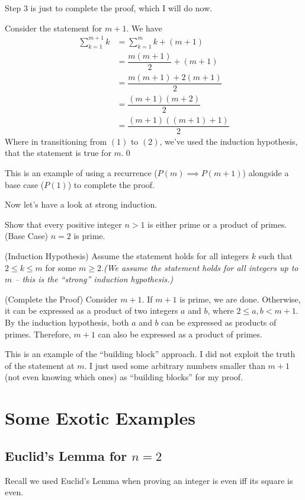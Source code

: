Step $3$ is just to complete the proof, which I will do now.
\begin{smrg}
Consider the statement for $m + 1$. We have
\begin{align}
\sum\limits_{k=1}^{m+1} k &= \sum\limits_{k=1}^{m} k + (m + 1) \\
&= \dfrac {m(m+1)}2 + (m + 1)\\
&= \dfrac {m(m+1) + 2(m + 1)}2 \\
&= \dfrac {(m + 1)(m + 2)}2\\
&= \dfrac {(m + 1)((m + 1) + 1)}2
\end{align}
Where in transitioning from $(1)$ to $(2)$, we've used the induction hypothesis, that the statement is true for $m$.\qed
\end{smrg}
This is an example of using a recurrence ($P(m) \implies P(m + 1)$) alongside a base case ($P(1)$) to complete the proof.

Now let's have a look at strong induction.
\begin{SWP}{\prb}{Show that every positive integer $n > 1$ is either prime or a product of primes.}(Base Case) $n = 2$ is prime.

(Induction Hypothesis) Assume the statement holds for all integers $k$ such that $2 \leq k \leq m$ for some $m \geq 2$.\hfill{\footnotesize\itshape(We assume the statement holds for all integers up to $m$ -- this is the ``strong'' induction hypothesis.)}

(Complete the Proof) Consider $m + 1$. If $m + 1$ is prime, we are done. Otherwise, it can be expressed as a product of two integers $a$ and $b$, where $2 \leq a, b < m + 1$. By the induction hypothesis, both $a$ and $b$ can be expressed as products of primes. Therefore, $m + 1$ can also be expressed as a product of primes.
\end{SWP}
This is an example of the ``building block'' approach. I did not exploit the truth of the statement at $m$. I just used some arbitrary numbers smaller than $m+1$ (not even knowing which ones) as ``building blocks'' for my proof.

\section*{Some Exotic Examples}
\subsection*{Euclid's Lemma for $n = 2$}
Recall we used Euclid's Lemma when proving an integer is even iff its square is even.

